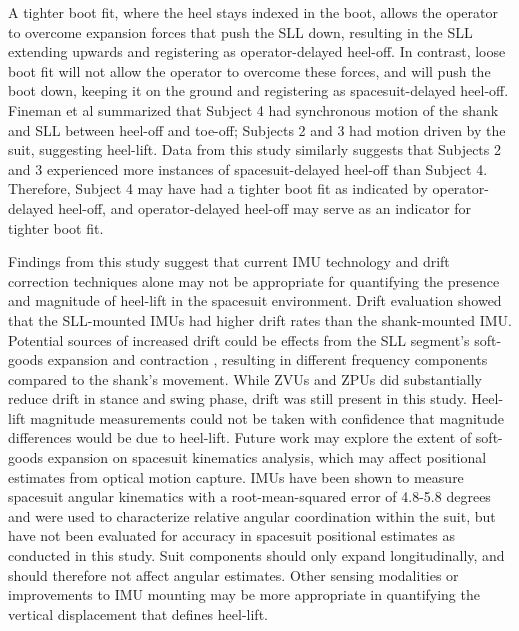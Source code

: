 \documentclass[defaultstyle,11pt]{thesis}
\begin{document}
A tighter boot fit, where the heel stays indexed in the boot, allows the operator to overcome expansion forces that push the SLL down, resulting in the SLL extending upwards and registering as operator-delayed heel-off.
In contrast, loose boot fit will not allow the operator to overcome these forces, and will push the boot down, keeping it on the ground and registering as spacesuit-delayed heel-off.
Fineman et al \citep{Fineman2018} summarized that Subject 4 had synchronous motion of the shank and SLL between heel-off and toe-off; Subjects 2 and 3 had motion driven by the suit, suggesting heel-lift.
Data from this study similarly suggests that Subjects 2 and 3 experienced more instances of spacesuit-delayed heel-off than Subject 4.
Therefore, Subject 4 may have had a tighter boot fit as indicated by operator-delayed heel-off, and operator-delayed heel-off may serve as an indicator for tighter boot fit.

Findings from this study suggest that current IMU technology and drift correction techniques alone may not be appropriate for quantifying the presence and magnitude of heel-lift in the spacesuit environment.
Drift evaluation showed that the SLL-mounted IMUs had higher drift rates than the shank-mounted IMU.
Potential sources of increased drift could be effects from the SLL segment's soft-goods expansion and contraction \citep{Fineman2018, Harris2001}, resulting in different frequency components compared to the shank's movement.
While ZVUs and ZPUs did substantially reduce drift in stance and swing phase, drift was still present in this study.
Heel-lift magnitude measurements could not be taken with confidence that magnitude differences would be due to heel-lift.
Future work may explore the extent of soft-goods expansion on spacesuit kinematics analysis, which may affect positional estimates from optical motion capture.
IMUs have been shown to measure spacesuit angular kinematics with a root-mean-squared error of 4.8-5.8 degrees\citep{Bertrand2014} and were used to characterize relative angular coordination within the suit\citep{Fineman2018}, but have not been evaluated for accuracy in spacesuit positional estimates as conducted in this study.
Suit components should only expand longitudinally, and should therefore not affect angular estimates\citep{Harris2001}.
Other sensing modalities or improvements to IMU mounting may be more appropriate in quantifying the vertical displacement that defines heel-lift.
\end{document}
